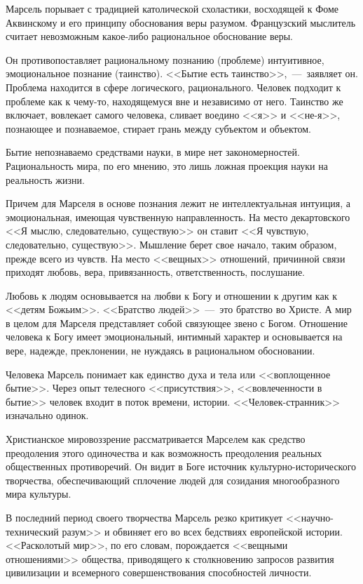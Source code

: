 \documentclass{bmstu}
\begin{document}
Марсель порывает с традицией католической схоластики, восходящей к Фоме Аквинскому и его принципу обоснования веры разумом. Французский мыслитель считает невозможным какое-либо рациональное обоснование веры.

Он противопоставляет рациональному познанию (проблеме) интуитивное, эмоциональное познание (таинство). <<Бытие есть таинство>>,~---~заявляет он. Проблема находится в сфере логического, рационального. Человек подходит к проблеме как к чему-то, находящемуся вне и независимо от него. Таинство же включает, вовлекает самого человека, сливает воедино <<я>> и <<не-я>>, познающее и познаваемое, стирает грань между субъектом и объектом.

Бытие непознаваемо средствами науки, в мире нет закономерностей. Рациональность мира, по его мнению, это лишь ложная проекция науки на реальность жизни.

Причем для Марселя в основе познания лежит не интеллектуальная интуиция, а эмоциональная, имеющая чувственную направленность. На место декартовского <<Я мыслю, следовательно, существую>> он ставит <<Я чувствую, следовательно, существую>>. Мышление берет свое начало, таким образом, прежде всего из чувств. На место <<вещных>> отношений, причинной связи приходят любовь, вера, привязанность, ответственность, послушание.

Любовь к людям основывается на любви к Богу и отношении к другим как к <<детям Божьим>>. <<Братство людей>>~---~это братство во Христе. А мир в целом для Марселя представляет собой связующее звено с Богом. Отношение человека к Богу имеет эмоциональный, интимный характер и основывается на вере, надежде, преклонении, не нуждаясь в рациональном обосновании.

Человека Марсель понимает как единство духа и тела или <<воплощенное бытие>>. Через опыт телесного <<присутствия>>, <<вовлеченности в бытие>> человек входит в поток времени, истории. <<Человек-странник>> изначально одинок.

Христианское мировоззрение рассматривается Марселем как средство преодоления этого одиночества и как возможность преодоления реальных общественных противоречий. Он видит в Боге источник культурно-исторического творчества, обеспечивающий сплочение людей для созидания многообразного мира культуры.

В последний период своего творчества Марсель резко критикует <<научно-технический разум>> и обвиняет его во всех бедствиях европейской истории. <<Расколотый мир>>, по его словам, порождается <<вещными отношениями>> общества, приводящего к столкновению запросов развития цивилизации и всемерного совершенствования способностей личности.
\end{document}
